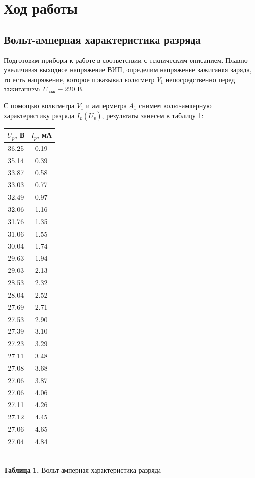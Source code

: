 \documentclass[a4paper,12pt]{article} %
\begin{document}
\section{Ход работы}

\subsection{Вольт-амперная характеристика разряда}
\hfill \break Подготовим приборы к работе в соответствии с техническим описанием. Плавно увеличивая выходное напряжение ВИП, определим напряжение зажигания заряда, то есть напряжение, которое показывал вольтметр $V_{1}$ непосредственно перед зажиганием: $U_\text{заж} = 220$ В. 

\hfill \break С помощью вольтметра $V_{1}$ и амперметра $A_{1}$ снимем вольт-амперную характеристику разряда $I_{p}(U_{p})$, результаты занесем в таблицу 1:

\begin{center}
\begin{tabular}{|c|c|}\hline
$ U_{p} $, В & $ I_{p} $, мА \\\hline
36.25 & 0.19 \\\hline
35.14 & 0.39 \\\hline
33.87 & 0.58 \\\hline
33.03 & 0.77 \\\hline
32.49 & 0.97 \\\hline
32.06 & 1.16 \\\hline
31.76 & 1.35 \\\hline
31.06 & 1.55 \\\hline
30.04 & 1.74 \\\hline
29.63 & 1.94 \\\hline
29.03 & 2.13 \\\hline
28.53 & 2.32 \\\hline
28.04 & 2.52 \\\hline
27.69 & 2.71 \\\hline
27.53 & 2.90 \\\hline
27.39 & 3.10 \\\hline
27.23 & 3.29 \\\hline
27.11 & 3.48 \\\hline
27.08 & 3.68 \\\hline
27.06 & 3.87 \\\hline
27.06 & 4.06 \\\hline
27.11 & 4.26 \\\hline
27.12 & 4.45 \\\hline
27.06 & 4.65 \\\hline
27.04 & 4.84 \\\hline
\end{tabular} \\
\hfill \break \textbf {Таблица 1.} Вольт-амперная характеристика разряда\\
\end{center}
\end{document}
